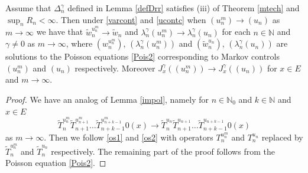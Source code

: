 \documentclass[10pt,english]{extarticle}
\begin{document}
\begin{theorem} Assume that $\Delta_n^\gamma$ defined in Lemma \ref{defDrr} satisfies (iii) of Theorem \ref{mtech} and $\sup_n R_n<\infty$. Then under \eqref{varcont} and \eqref{ucontc}
 when  $(u_n^m)\to (u_n)$ as $m\to \infty$ we have that
$\tilde{w}_n^{u_n^m}\to \tilde{w}_n$ and $\lambda_n^\gamma(u_n^m)\to \lambda_n^\gamma(u_n)$ for each $n\in \mathbb{N}$ and $\gamma \neq 0$ as $m\to \infty$, where $(w_n^{u_n^m})$, $(\lambda_n^\gamma(u_n^m))$ and $(\tilde{w}_n^{u_n})$, $(\lambda_n^\gamma(u_n))$ are solutions to the Poisson equations \eqref{Pois2} corresponding to Markov controls $(u_n^m)$ and $(u_n)$ respectively. Moreover $J_x^\gamma((u_n^m))\to J_x^\gamma((u_n))$ for $x\in E$ and $m\to \infty$.
\end{theorem}
\begin{proof} We have an analog of Lemma \ref{impol}, namely for $n\in \mathbb{N}_0$ and $k\in \mathbb{N}$ and $x\in E$
\begin{equation}
\tilde{T}_n^{u_n^m}\tilde{T}_{n+1}^{u_{n+1}^m}\ldots \tilde{T}_{n+k-1}^{u_{n+k-1}^m}0(x) \to \tilde{T}_n^{u_n}\tilde{T}_{n+1}^{u_{n+1}}\ldots \tilde{T}_{n+k-1}^{u_{n+k-1}}0(x)
\end{equation}
as $m\to \infty$. Then we follow \eqref{os1} and \eqref{os2} with operators $T_n^{u_n^m}$ and $T_n^{u_n}$ replaced by $\tilde{T}_n^{u_n^m}$ and $\tilde{T}_n^{u_n}$ respectively. The remaining part of the proof follows from the Poisson equation \eqref{Pois2}.
\end{proof}
\end{document}
